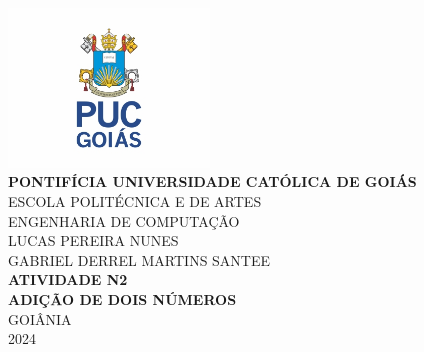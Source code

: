 \documentclass[12pt, openany, oneside, a4paper, brazil]{abntex2}
\begin{document}
 
	\begin{center}
		\vspace*{-3cm}
		\includegraphics[width=0.4\textwidth]{puc_go}\\[0.5cm]
		\textbf{PONTIFÍCIA UNIVERSIDADE CATÓLICA DE GOIÁS}\\
		ESCOLA POLITÉCNICA E DE ARTES\\
		ENGENHARIA DE COMPUTAÇÃO\\[2cm]
		
		\MakeUppercase{Lucas Pereira Nunes}\\
		\MakeUppercase{Gabriel Derrel Martins Santee}\\[6cm]
		
		{\ABNTEXchapterfont\bfseries\Large \MakeUppercase{Atividade N2\\Adição de dois números}}\\[3cm]
		
		\vfill
		GOIÂNIA\\
		2024
		
	\end{center}
	
	\newpage
	
	\tableofcontents*
	\cleardoublepage
	
	\chapter*[Resposta]{}
	\newpage
	\textual
	\setcounter{page}{1}
\end{document}
